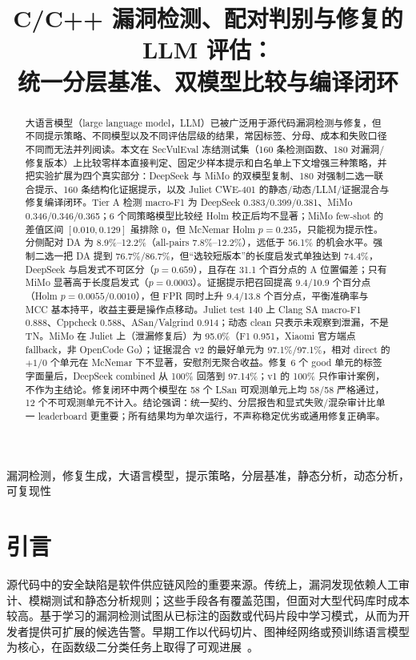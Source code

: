 \documentclass[conference]{IEEEtran}
\title{C/C++ 漏洞检测、配对判别与修复的 LLM 评估：\\统一分层基准、双模型比较与编译闭环}
\author{
\IEEEauthorblockN{Yu Zhang}
\IEEEauthorblockA{CS224 课程项目\\
ShanghaiTech University\\
Shanghai, China\\
\href{mailto:Zhangyu12026@shanghaitech.edu.cn}{Zhangyu12026@shanghaitech.edu.cn}}
}
\begin{document}
\maketitle

\begin{abstract}
大语言模型（large language model，LLM）已被广泛用于源代码漏洞检测与修复，但不同提示策略、不同模型以及不同评估层级的结果，常因标签、分母、成本和失败口径不同而无法并列阅读。本文在 SecVulEval 冻结测试集（160 条检测函数、180 对漏洞/修复版本）上比较零样本直接判定、固定少样本提示和白名单上下文增强三种策略，并把实验扩展为四个真实部分：DeepSeek 与 MiMo 的双模型复制、180 对强制二选一联合提示、160 条结构化证据提示，以及 Juliet CWE-401 的静态/动态/LLM/证据混合与修复编译闭环。Tier A 检测 macro-F1 为 DeepSeek 0.383/0.399/0.381、MiMo 0.346/0.346/0.365；6 个同策略模型比较经 Holm 校正后均不显著；MiMo few-shot 的差值区间 $[0.010,0.129]$ 虽排除 0，但 McNemar Holm $p=0.235$，只能视为提示性。分侧配对 DA 为 8.9\%--12.2\%（all-pairs 7.8\%--12.2\%），远低于 56.1\% 的机会水平。强制二选一把 DA 提到 76.7\%/86.7\%，但“选较短版本”的长度启发式单独达到 74.4\%，DeepSeek 与启发式不可区分（$p=0.659$），且存在 31.1 个百分点的 A 位置偏差；只有 MiMo 显著高于长度启发式（$p=0.0003$）。证据提示把召回提高 9.4/10.9 个百分点（Holm $p=0.0055/0.0010$），但 FPR 同时上升 9.4/13.8 个百分点，平衡准确率与 MCC 基本持平，收益主要是操作点移动。Juliet test 140 上 Clang SA macro-F1 0.888、Cppcheck 0.588、ASan/Valgrind 0.914；动态 clean 只表示未观察到泄漏，不是 TN。MiMo 在 Juliet 上（泄漏修复后）为 95.0\%（F1 0.951，Xiaomi 官方端点 fallback，非 OpenCode Go）；证据混合 v2 的最好单元为 97.1\%/97.1\%，相对 direct 的 $+1/0$ 个单元在 McNemar 下不显著，安慰剂无聚合收益。修复 6 个 good 单元的标签字面量后，DeepSeek combined 从 100\% 回落到 97.14\%；v1 的 100\% 只作审计案例，不作为主结论。修复闭环中两个模型在 58 个 LSan 可观测单元上均 58/58 严格通过，12 个不可观测单元不计入。结论强调：统一契约、分层报告和显式失败/混杂审计比单一 leaderboard 更重要；所有结果均为单次运行，不声称稳定优劣或通用修复正确率。
\end{abstract}

\begin{IEEEkeywords}
漏洞检测，修复生成，大语言模型，提示策略，分层基准，静态分析，动态分析，可复现性
\end{IEEEkeywords}

\section{引言}
\label{sec:intro}
源代码中的安全缺陷是软件供应链风险的重要来源。传统上，漏洞发现依赖人工审计、模糊测试和静态分析规则；这些手段各有覆盖范围，但面对大型代码库时成本较高。基于学习的漏洞检测试图从已标注的函数或代码片段中学习模式，从而为开发者提供可扩展的候选告警。早期工作以代码切片、图神经网络或预训练语言模型为核心，在函数级二分类任务上取得了可观进展~\cite{li2018vuldeepecker,zhou2019devign,feng2020codebert,fu2022linevul}。
\end{document}
